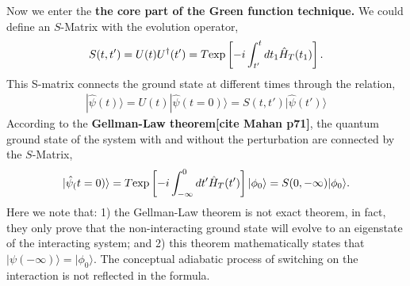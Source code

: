 \documentclass[11pt]{article}
\begin{document}
    Now we enter the \textbf{the core part of the Green function technique.}
We could define an \(S\)-Matrix with the evolution operator,
\begin{eqnarray}
S(t,t') = U(t) U^\dagger(t')= T {\rm exp}\left[-i\int_{t'}^t dt_1 {\hat H}_T(t_1)\right].
\end{eqnarray} This S-matrix connects the ground state at different
times through the relation, \begin{eqnarray}
|\hat \psi(t)\rangle=U(t) | \hat \psi(t=0)\rangle=S(t,t')|\hat \psi(t')\rangle
\end{eqnarray} According to the \textbf{Gellman-Law theorem{[}cite Mahan
p71{]}}, the quantum ground state of the system with and without the
perturbation are connected by the \(S\)-Matrix, \begin{eqnarray}
|\hat \psi_(t=0) \rangle =T {\rm exp}\left[-i\int_{-\infty}^0 dt' \hat H_T(t')\right] |\phi_0 \rangle = S(0,-\infty) |\phi _0 \rangle.
\end{eqnarray} Here we note that: 1) the Gellman-Law theorem is not
exact theorem, in fact, they only prove that the non-interacting ground
state will evolve to an eigenstate of the interacting system; and 2)
this theorem mathematically states that
\(|\psi(-\infty) \rangle = |\phi_0 \rangle\). The conceptual adiabatic
process of switching on the interaction is not reflected in the formula.
\end{document}
